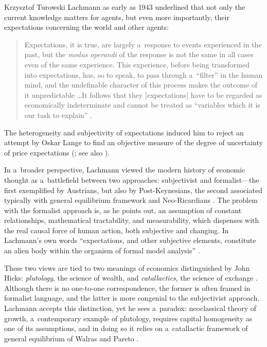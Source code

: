 \begin{artengenv}{Krzysztof Turowski}
Lachmann as early as 1943 underlined that not only the current knowledge matters for agents, but even more importantly, their expectations concerning the world and other agents:
\begin{quote}
Expectations, it is true, are largely a~response to events experienced in the past, but the \emph{modus operandi} of the response is not the same in all cases even of the same experience. This experience, before being transformed into expectations, has, so to speak, to pass through a~``filter'' in the human mind, and the undefinable character of this process makes the outcome of it unpredictable \ldots It follows that they [expectations] have to be regarded as economically indeterminate and cannot be treated as ``variables which it is our task to explain'' \parencite[67]{lachmann-role-expectations}.
\end{quote}
The heterogeneity and subjectivity of expectations induced him to reject an attempt by Oskar Lange to find an objective measure of the degree of uncertainty of price expectations (\cite[120]{lachmann-expectations}; see also \cite[422]{van-zijp}).

In a~broader perspective, Lachmann viewed the modern history of economic thought as a~battlefield between two approaches: subjectivist and formalist---the first exemplified by Austrians, but also by Post-Keynesians, the second associated typically with general equilibrium framework and Neo-Ricardians \parencite[22--23, 164]{lachmann1986market}.
The problem with the formalist approach is, as he points out, an assumption of constant relationships, mathematical tractability, and measurability, which dispenses with the real causal force of human action, both subjective and changing.
In Lachmann's own words ``expectations, and other subjective elements, constitute an alien body within the organism of formal model analysis'' \parencite[249]{lachmann-hicks}.

These two views are tied to two meanings of economics distinguished by John Hicks: \emph{plutology}, the science of wealth, and \emph{catallactics}, the science of exchange \parencite[215]{hicks}.
Although there is no one-to-one correspondence, the former is often framed in formalist language, and the latter is more congenial to the subjectivist approach.
Lachmann accepts this distinction, yet he sees a~paradox: neoclassical theory of growth, a~contemporary example of plutology, requires capital homogeneity as one of its assumptions, and in doing so it relies on a~catallactic framework of general equilibrium of Walras and Pareto \parencite[25--26]{lachmann1986market}.


\end{artengenv}
